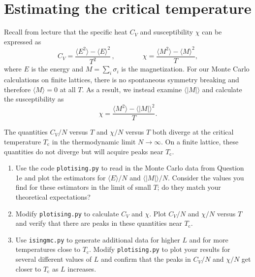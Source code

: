 \documentclass[letterpaper]{scrartcl}
\begin{document}
\section{Estimating the critical temperature}

Recall from lecture that the specific heat $C_V$ and susceptibility $\chi$ can be expressed as 
\begin{equation*}
C_V = \frac{\langle E^2 \rangle - \langle E \rangle^2}{T^2} \, , \qquad \qquad
\chi = \frac{\langle M^2 \rangle - \langle M \rangle^2}{T},
\end{equation*}
where $E$ is the energy and $M = \sum_i \sigma_i$ is the magnetization.
For our Monte Carlo calculations on finite lattices, there is no spontaneous symmetry breaking and therefore $\langle M \rangle = 0$ at all $T$. 
As a result, we instead examine $\langle | M | \rangle$ and calculate the susceptibility as
\begin{equation*}
\chi = \frac{\langle M^2 \rangle - \langle | M | \rangle^2}{T}.
\end{equation*}

The quantities $C_V/N$ versus $T$ and $\chi/N$ versus $T$ both diverge at the critical temperature $T_\text{c}$ in the thermodynamic limit $N \to \infty$.
On a finite lattice, these quantities do not diverge but will acquire peaks near $T_\text{c}$. 

\begin{enumerate}[label=\alph*)]

\item Use the code \texttt{plot{\textunderscore}ising.py} to read in the Monte Carlo data from Question 1e 
and plot the estimators for $\langle E \rangle/N$ and $\langle | M | \rangle/N$.
Consider the values you find for these estimators in the limit of small $T$; do they match your theoretical expectations?

\item Modify \texttt{plot{\textunderscore}ising.py} to calculate $C_V$ and $\chi$. 
Plot $C_V/N$ and $\chi/N$ versus $T$ and verify that there are peaks in these quantities near $T_\text{c}$.

\item Use \texttt{ising{\textunderscore}mc.py} to generate additional data for higher $L$ and for more temperatures close to $T_\text{c}$. 
Modify \texttt{plot{\textunderscore}ising.py} to plot your results for several different values of $L$ and confirm that the peaks in $C_V/N$ and $\chi/N$
get closer to $T_\text{c}$ as $L$ increases.

\end{enumerate}
\end{document}
